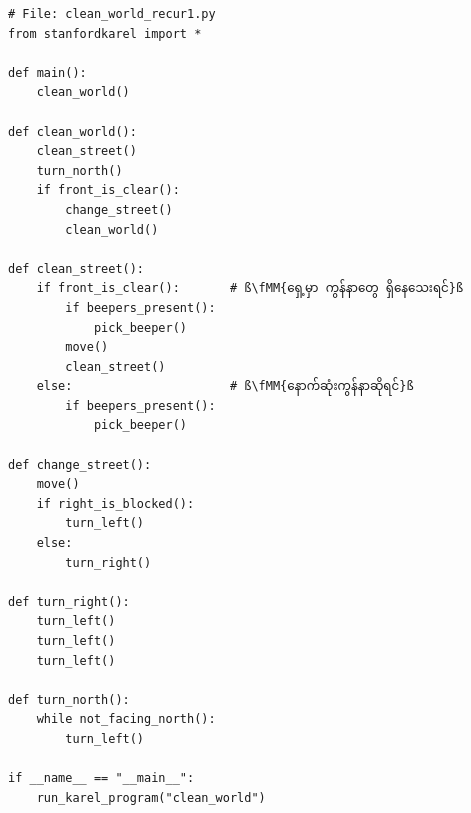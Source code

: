 \begin{verbatim}
# File: clean_world_recur1.py
from stanfordkarel import *

def main():
    clean_world()

def clean_world():
    clean_street()
    turn_north()
    if front_is_clear():
        change_street()
        clean_world()

def clean_street():
    if front_is_clear():       # ß\fMM{ရှေ့မှာ ကွန်နာတွေ ရှိနေသေးရင်}ß
        if beepers_present():
            pick_beeper()
        move()
        clean_street()
    else:                      # ß\fMM{နောက်ဆုံးကွန်နာဆိုရင်}ß
        if beepers_present():
            pick_beeper()

def change_street():
    move()
    if right_is_blocked():
        turn_left()
    else:
        turn_right()

def turn_right():
    turn_left()
    turn_left()
    turn_left()

def turn_north():
    while not_facing_north():
        turn_left()

if __name__ == "__main__":
    run_karel_program("clean_world")
\end{verbatim}
%